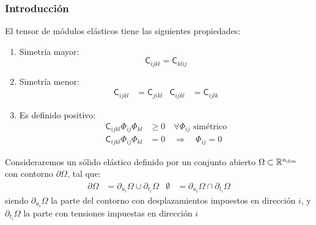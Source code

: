 \documentclass[10pt, aspectratio=43]{beamer}
\begin{document}
\begin{frame}
\frametitle{Introducción}
El tensor de módulos elásticos tiene las siguientes propiedades:
\begin{enumerate}
\item Simetría mayor:
\begin{equation}
\mathsf{C}_{ijkl}=\mathsf{C}_{klij} \label{scmayor}
\end{equation}
\item Simetría menor:
\begin{align}
\mathsf{C}_{ijkl}&=\mathsf{C}_{jikl} &
\mathsf{C}_{ijkl}&=\mathsf{C}_{ijlk}
\end{align}
\item Es definido positivo:
\begin{align}
\mathsf{C}_{ijkl} \Phi_{ij} \Phi_{kl}& \geq 0 \quad \forall \Phi_{ij}
\textrm{ simétrico} \label{sfcdpos1}\\
\mathsf{C}_{ijkl} \Phi_{ij} \Phi_{kl} &=0 \quad \Rightarrow \quad
\Phi_{ij}=0 \label{sfcdpos2}
\end{align}
\end{enumerate}
Consideraremos un sólido elástico definido por un conjunto abierto
$\Omega \subset \mathbb{R}^{n_{\rm dim}}$ con contorno
$\partial \Omega$, tal que:
\begin{align}
\partial \Omega &=\partial_{u_i} \Omega \cup \partial_{t_i} \Omega &
\emptyset       &=\partial_{u_i} \Omega \cap \partial_{t_i} \Omega
\end{align}
siendo $\partial_{u_i} \Omega$ la parte del contorno con desplazamientos
impuestos en dirección $i$, y $\partial_{t_i} \Omega$ la parte con tensiones
impuestas en dirección $i$
\end{frame}

\end{document}
